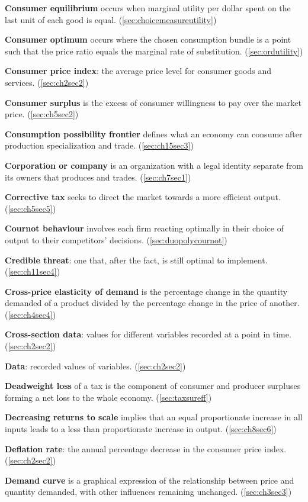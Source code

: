 \textbf{Consumer equilibrium} occurs when marginal utility per dollar spent on the last unit of each good is equal. (\ref{sec:choicemeasureutility})

\textbf{Consumer optimum} occurs where the chosen consumption bundle is a point such that the price ratio equals the marginal rate of substitution. (\ref{sec:ordutility})

\textbf{Consumer price index}: the average price level for consumer goods and services. (\ref{sec:ch2sec2})

\textbf{Consumer surplus} is the excess of consumer willingness to pay over the market price. (\ref{sec:ch5sec2})

\textbf{Consumption possibility frontier} defines what an economy can consume after production specialization and trade. (\ref{sec:ch15sec3})

\textbf{Corporation or company} is an organization with a legal identity separate from its owners that produces and trades. (\ref{sec:ch7sec1})

\textbf{Corrective tax} seeks to direct the market towards a more efficient output. (\ref{sec:ch5sec5})

\textbf{Cournot behaviour} involves each firm reacting optimally in their choice of output to their competitors' decisions. (\ref{sec:duopolycournot})

\textbf{Credible threat}: one that, after the fact, is still optimal to implement. (\ref{sec:ch11sec4})

\textbf{Cross-price elasticity of demand} is the percentage change in the quantity demanded of a product divided by the percentage change in the price of another. (\ref{sec:ch4sec4})

\textbf{Cross-section data}: values for different variables recorded at a point in time. (\ref{sec:ch2sec2})

\textbf{Data}: recorded values of variables. (\ref{sec:ch2sec2})

\textbf{Deadweight loss} of a tax is the component of consumer and producer surpluses forming a net loss to the whole economy. (\ref{sec:taxsureff})

\textbf{Decreasing returns to scale} implies that an equal proportionate increase in all inputs leads to a less than proportionate increase in output. (\ref{sec:ch8sec6})

\textbf{Deflation rate}: the annual percentage decrease in the consumer price index. (\ref{sec:ch2sec2})

\textbf{Demand curve} is a graphical expression of the relationship between price and quantity demanded, with other influences remaining unchanged. (\ref{sec:ch3sec3})

